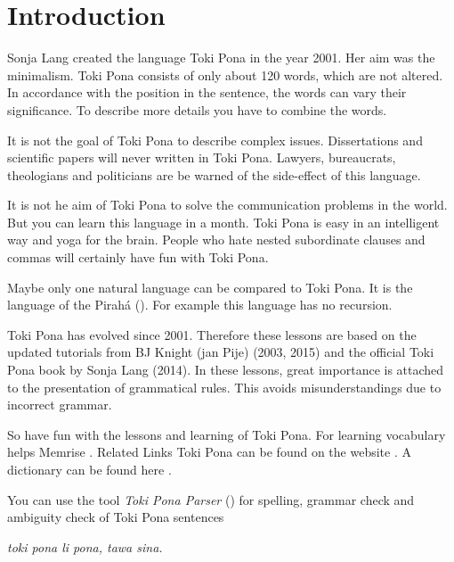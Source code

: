 \section{Introduction}
%
Sonja Lang created the language Toki Pona in the year 2001. 
Her aim was the minimalism. 
Toki Pona consists of only about 120 words, which are not altered. 
In accordance with the position in the sentence, the words can vary their significance. 
To describe more details you have to combine the words.

It is not the goal of Toki Pona to describe complex issues. 
Dissertations and scientific papers will never written in Toki Pona. 
Lawyers, bureaucrats, theologians and politicians are be warned of the side-effect of this language.

It is not he aim of Toki Pona to solve the communication problems in the world. 
But you can learn this language in a month. 
Toki Pona is easy in an intelligent way and yoga for the brain. 
People who hate nested subordinate clauses and commas will certainly have fun with Toki Pona.

Maybe only one natural language can be compared to Toki Pona. 
It is the language of the Pirah\'{a} (\cite{www:piraha:01}). 
For example this language has no recursion. 

%
%
Toki Pona has evolved since 2001. 
Therefore these lessons are based on the updated tutorials from BJ Knight (jan Pije) \cite{www:Pije:01} (2003, 2015) and the official Toki Pona book \cite{www:tokipona.org} by Sonja Lang (2014).
In these lessons, great importance is attached to the presentation of grammatical rules. 
This avoids misunderstandings due to incorrect grammar.

So have fun with the lessons and learning of Toki Pona. 
For learning vocabulary helps Memrise \cite{www:memrise:01}. Related Links Toki Pona can be found on the website \cite{www:rowa:01}. 
A dictionary can be found here \cite{www:rowa:01}. 

You can use the tool \textit{Toki Pona Parser} (\cite{www:rowa:02}) for spelling, grammar check and ambiguity check of Toki Pona sentences 


\textit{toki pona li pona, tawa sina.}
%
